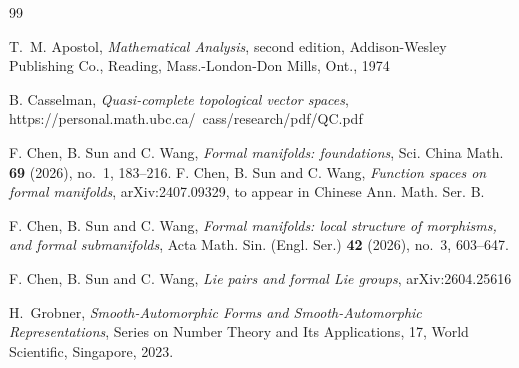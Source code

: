 \documentclass[12pt, a4paper]{amsart}
\renewcommand{\v}{\mathfrak v}
\theoremstyle{Theorem}
\theoremstyle{Theorem}
\theoremstyle{Theorem}
\theoremstyle{Theorem}
\theoremstyle{Plain}
\theoremstyle{remark}
\theoremstyle{remark}
\theoremstyle{Definition}
\numberwithin{equation}{section}
\begin{document}
\begin{thebibliography}{99}



T.~M. Apostol, \textit{ Mathematical Analysis}, second edition, 
Addison-Wesley Publishing Co., Reading, Mass.-London-Don Mills, Ont., 1974



B. Casselman, \textit{Quasi-complete topological vector spaces}, https://personal.math.ubc.ca/~cass/research/pdf/QC.pdf

 F. Chen, B. Sun and C. Wang, \textit{Formal manifolds: foundations}, Sci. China Math. {\bf 69} (2026), no.~1, 183--216.
 F. Chen, B. Sun and C. Wang, \textit{Function spaces on formal manifolds}, arXiv:2407.09329, to appear in Chinese Ann. Math. Ser. B.


 F. Chen, B. Sun and C. Wang,
\textit{Formal manifolds: local structure of morphisms, and formal submanifolds},
Acta Math. Sin. (Engl. Ser.) {\bf 42} (2026), no.~3, 603--647.

 F. Chen, B. Sun and C. Wang,
 \textit{Lie pairs and formal Lie groups}, arXiv:2604.25616

 
H.~Grobner, \textit{Smooth-Automorphic Forms and Smooth-Automorphic Representations},
Series on Number Theory and Its Applications, 17, World Scientific, Singapore, 2023.










\end{thebibliography}
\end{document}
